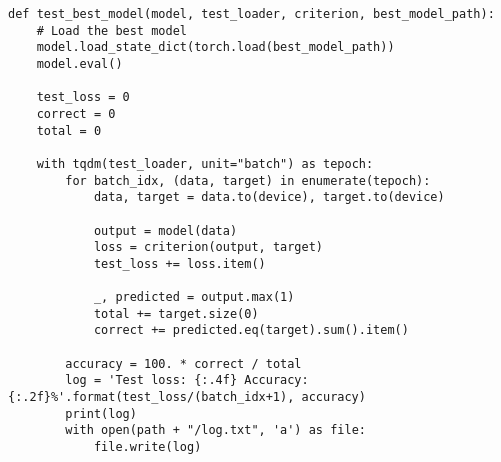 \documentclass{article} %
\begin{document}
\begin{lstlisting}
def test_best_model(model, test_loader, criterion, best_model_path):
    # Load the best model
    model.load_state_dict(torch.load(best_model_path))
    model.eval()

    test_loss = 0
    correct = 0
    total = 0

    with tqdm(test_loader, unit="batch") as tepoch:
        for batch_idx, (data, target) in enumerate(tepoch):
            data, target = data.to(device), target.to(device)

            output = model(data)
            loss = criterion(output, target)
            test_loss += loss.item()

            _, predicted = output.max(1)
            total += target.size(0)
            correct += predicted.eq(target).sum().item()

        accuracy = 100. * correct / total        
        log = 'Test loss: {:.4f} Accuracy: {:.2f}%'.format(test_loss/(batch_idx+1), accuracy)
        print(log)
        with open(path + "/log.txt", 'a') as file:
            file.write(log)
\end{lstlisting}
\end{document}
